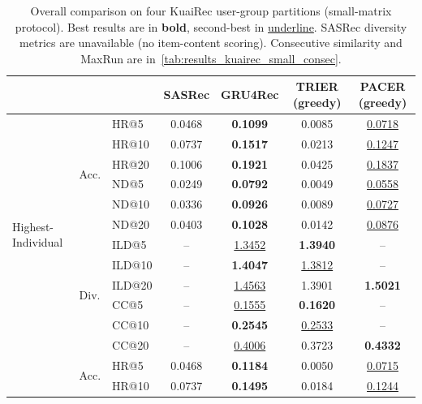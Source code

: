 \begin{table}[t]
\centering
\caption{Overall comparison on four KuaiRec user-group partitions (small-matrix protocol).
Best results are in \textbf{bold}, second-best in \underline{underline}.
SASRec diversity metrics are unavailable (no item-content scoring).
Consecutive similarity and MaxRun are in~\cref{tab:results_kuairec_small_consec}.}
\label{tab:results_kuairec_small_main}
\begin{tabular}{lllcccc}
\toprule
& & & SASRec & GRU4Rec & TRIER (greedy) & PACER (greedy) \\
\midrule
\multirow{12}{*}{Highest-Individual}
 & \multirow{6}{*}{Acc.}
 & HR@5  & 0.0468 & \textbf{0.1099} & 0.0085 & \underline{0.0718} \\
 & & HR@10 & 0.0737 & \textbf{0.1517} & 0.0213 & \underline{0.1247} \\
 & & HR@20 & 0.1006 & \textbf{0.1921} & 0.0425 & \underline{0.1837} \\
 & & ND@5  & 0.0249 & \textbf{0.0792} & 0.0049 & \underline{0.0558} \\
 & & ND@10 & 0.0336 & \textbf{0.0926} & 0.0089 & \underline{0.0727} \\
 & & ND@20 & 0.0403 & \textbf{0.1028} & 0.0142 & \underline{0.0876} \\
 & \multirow{6}{*}{Div.}
 & ILD@5  & -- & \underline{1.3452} & \textbf{1.3940} & -- \\
 & & ILD@10 & -- & \textbf{1.4047} & \underline{1.3812} & -- \\
 & & ILD@20 & -- & \underline{1.4563} & 1.3901 & \textbf{1.5021} \\
 & & CC@5   & -- & \underline{0.1555} & \textbf{0.1620} & -- \\
 & & CC@10  & -- & \textbf{0.2545} & \underline{0.2533} & -- \\
 & & CC@20  & -- & \underline{0.4006} & 0.3723 & \textbf{0.4332} \\
\addlinespace[0.3em]
\multirow{12}{*}{Highest-Average}
 & \multirow{6}{*}{Acc.}
 & HR@5  & 0.0468 & \textbf{0.1184} & 0.0050 & \underline{0.0715} \\
 & & HR@10 & 0.0737 & \textbf{0.1495} & 0.0184 & \underline{0.1244} \\

\end{tabular}
\end{table}
